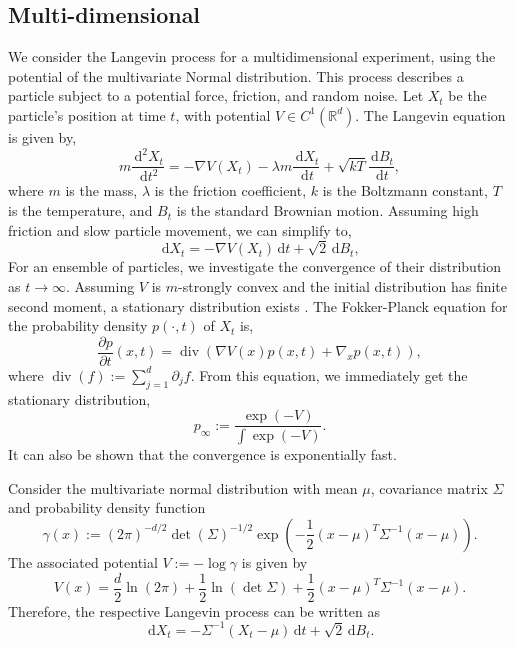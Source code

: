\documentclass[12pt]{article}
\theoremstyle{remark}
\theoremstyle{plain}
\numberwithin{equation}{section}
\newcommand{\dd}{\ensuremath{\,\mathrm d}}
\newcommand{\R}{\mathbb{R}}
\begin{document}
\subsection{Multi-dimensional}
\label{sec:multi_d}
We consider the Langevin process for a multidimensional experiment, using the potential of the multivariate Normal distribution. This process describes a particle subject to a potential force, friction, and random noise.
Let $X_t$ be the particle's position at time $t$, with potential $V \in C^1(\R^d)$. The Langevin equation is given by,
\begin{equation*}
    m \frac{\dd^2 X_t}{\dd t^2} = -\nabla V(X_t) - \lambda m \frac{\dd X_t}{\dd t} + \sqrt{kT} \frac{\dd B_t}{\dd t},
\end{equation*}
where $m$ is the mass, $\lambda$ is the friction coefficient, $k$ is the Boltzmann constant, $T$ is the temperature, and $B_t$ is the standard Brownian motion.
Assuming high friction and slow particle movement, we can simplify to,
\begin{equation*}
    \dd X_t = -\nabla V(X_t)\dd t + \sqrt{2}\dd B_t,
\end{equation*}
For an ensemble of particles, we investigate the convergence of their distribution as $t \to \infty$. Assuming $V$ is $m$-strongly convex and the initial distribution has finite second moment, a stationary distribution exists \cite{bj/1178291835}.
The Fokker-Planck equation for the probability density $p(\cdot, t)$ of $X_t$ is,
\begin{equation*}
    \frac{\partial p}{\partial t}(x, t) = \operatorname{div}(\nabla V(x) p(x,t) + \nabla_x p(x,t)),
\end{equation*}
where $\operatorname{div}(f) := \sum_{j=1}^d \partial_j f$. From this equation, we immediately get the stationary distribution,
\begin{equation*}
    p_\infty := \frac{\exp(-V)}{\int \exp(-V) }.
\end{equation*}
It can also be shown that the convergence is exponentially fast.

Consider the multivariate normal distribution with mean $\mu$, covariance matrix $\Sigma$ and probability density function
\begin{equation*}
    \gamma(x) := (2\pi)^{-d/2} \det(\Sigma)^{-1/2} \exp\left(-\frac 1 2 (x-\mu)^T \Sigma^{-1} (x-\mu)\right).
\end{equation*}
The associated potential $V := -\log\gamma$ is given by
\begin{equation*}
    V(x) = \frac d 2 \ln(2\pi) + \frac 1 2 \ln(\det \Sigma) + \frac 1 2 (x-\mu)^T \Sigma^{-1}(x-\mu).
\end{equation*}
Therefore, the respective Langevin process can be written as
\begin{equation*}
    \dd X_t = -\Sigma^{-1}(X_t - \mu)\dd t + \sqrt{2}\dd B_t.
\end{equation*}
\end{document}
